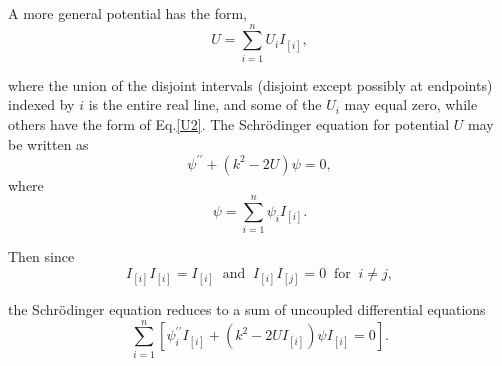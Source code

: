 \documentclass{article}
\numberwithin{equation}{section}
\begin{document}
A more general potential has the form,
\begin{equation}
U=\sum_{i=1}^{n}U_{i}I_{\left[i\right]},\label{Ugen}
\end{equation}

where the union of the disjoint intervals (disjoint except possibly at endpoints) indexed by $i$ is the entire real line, and some of the $U_i$ may equal zero, while others have the form of Eq.\eqref{U2}.  The Schr\"odinger equation for potential $U$ may be written as
\begin{equation}
\psi^{\prime\prime}+\left(k^2-2U\right)\psi=0,\label{Ugen}
\end{equation}
where
\begin{equation}
\psi=\sum_{i=1}^{n}\psi_{i}I_{\left[i\right]}.\label{psigen}
\end{equation}

Then since
\begin{equation}
I_{\left[i\right]}I_{\left[i\right]}=I_{\left[i\right]}\;\;\text{and}\;\;I_{\left[i\right]}I_{\left[j\right]}=0\;\;\text{for}\;\; i\neq j,\label{Irules}
\end{equation}

the Schr\"odinger equation reduces to a sum of uncoupled differential equations
\begin{equation}
\sum_{i=1}^{n}\left[\psi_{i}^{\prime\prime}I_{\left[i\right]}+\left(k^2-2UI_{\left[i\right]}\right)\psi I_{\left[i\right]}=0\right].\label{Sgen}
\end{equation}
\end{document}
